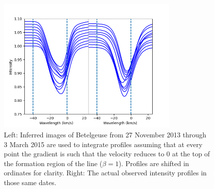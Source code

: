 \documentclass{/Users/art2/TeX/aanda/aa}
\def\kms {km\,s$^{-1}$}
\begin{document}
\begin{figure}
   \includegraphics[width=0.8\textwidth]{Fig5_art74.png}
   \caption{Left: Inferred images of Betelgeuse from 27 November 2013 through 3 March 2015 are used to integrate profiles assuming that at every point 
   the gradient is such that the velocity reduces to 0 at the top of the formation region of the line ($\beta=1$). Profiles are shifted in ordinates 
   for clarity. Right: The actual observed intensity profiles in those same dates.}
   \label{betelbeta1}
   \end{figure}
\end{document}
